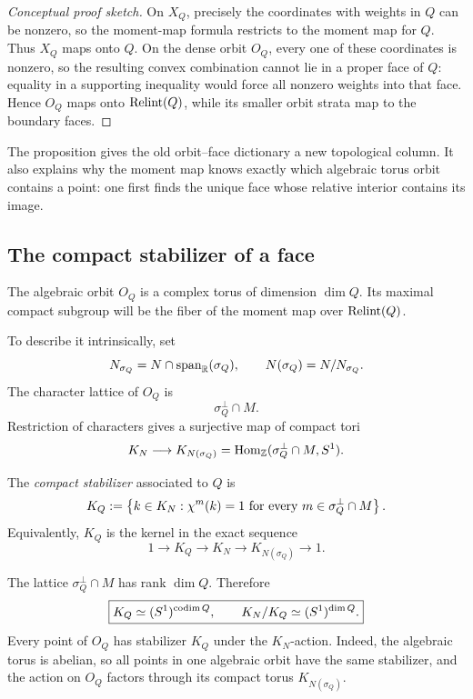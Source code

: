\begin{proof}[Conceptual proof sketch]
On \(X_Q\), precisely the coordinates with weights in \(Q\) can be
nonzero, so the moment-map formula restricts to the moment map for
\(Q\). Thus \(X_Q\) maps onto \(Q\). On the dense orbit \(O_Q\), every
one of these coordinates is nonzero, so the resulting convex
combination cannot lie in a proper face of \(Q\): equality in a
supporting inequality would force all nonzero weights into that face.
Hence \(O_Q\) maps onto \(\operatorname{Relint}(Q)\), while its smaller
orbit strata map to the boundary faces.
\end{proof}

The proposition gives the old orbit--face dictionary a new topological
column. It also explains why the moment map knows exactly which
algebraic torus orbit contains a point: one first finds the unique face
whose relative interior contains its image.

\subsection{The compact stabilizer of a face}

The algebraic orbit \(O_Q\) is a complex torus of dimension \(\dim Q\).
Its maximal compact subgroup will be the fiber of the moment map over
\(\operatorname{Relint}(Q)\).

To describe it intrinsically, set
\[
N_{\sigma_Q}
=N\cap\operatorname{span}_{\mathbb{R}}(\sigma_Q),
\qquad
N(\sigma_Q)=N/N_{\sigma_Q}.
\]
The character lattice of \(O_Q\) is
\[
\sigma_Q^\perp\cap M.
\]
Restriction of characters gives a surjective map of compact tori
\[
K_N
\longrightarrow
K_{N(\sigma_Q)}
=\operatorname{Hom}_{\mathbb{Z}}(\sigma_Q^\perp\cap M,S^1).
\]

\begin{definition}
\label{def:compact-stabilizer-face}
The \emph{compact stabilizer} associated to \(Q\) is
\[
K_Q
:=
\left\{
k\in K_N:
\chi^{m}(k)=1
\text{ for every }m\in\sigma_Q^\perp\cap M
\right\}.
\]
Equivalently, \(K_Q\) is the kernel in the exact sequence
\[
1\longrightarrow K_Q
\longrightarrow K_N
\longrightarrow K_{N(\sigma_Q)}
\longrightarrow1.
\]
\end{definition}

The lattice \(\sigma_Q^\perp\cap M\) has rank \(\dim Q\). Therefore
\[
\boxed{
K_Q\simeq(S^1)^{\operatorname{codim} Q},
\qquad
K_N/K_Q\simeq(S^1)^{\dim Q}.
}
\]
Every point of \(O_Q\) has stabilizer \(K_Q\) under the \(K_N\)-action.
Indeed, the algebraic torus is abelian, so all points in one algebraic
orbit have the same stabilizer, and the action on \(O_Q\) factors
through its compact torus \(K_{N(\sigma_Q)}\).


